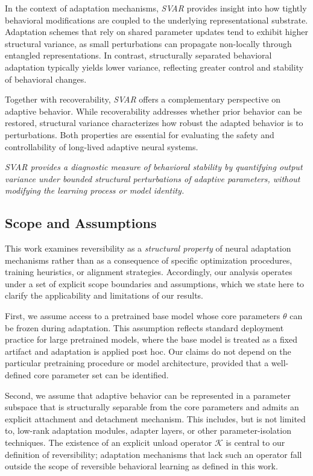 \documentclass[10pt]{article}
\begin{document}
	In the context of adaptation mechanisms, \emph{SVAR} provides insight into how tightly behavioral modifications are coupled to the underlying representational substrate. Adaptation schemes that rely on shared parameter updates tend to exhibit higher structural variance, as small perturbations can propagate non-locally through entangled representations. In contrast, structurally separated behavioral adaptation typically yields lower variance, reflecting greater control and stability of behavioral changes.
	
	Together with recoverability, \emph{SVAR} offers a complementary perspective on adaptive behavior. While recoverability addresses whether prior behavior can be restored, structural variance characterizes how robust the adapted behavior is to perturbations. Both properties are essential for evaluating the safety and controllability of long-lived adaptive neural systems.
	
	\emph{SVAR provides a diagnostic measure of behavioral stability by quantifying output variance under bounded structural perturbations of adaptive parameters, without modifying the learning process or model identity.}
	
	\subsection{Scope and Assumptions}
	\label{sec:scope}
	
	This work examines reversibility as a \emph{structural property} of neural adaptation mechanisms rather than as a consequence of specific optimization procedures, training heuristics, or alignment strategies. Accordingly, our analysis operates under a set of explicit scope boundaries and assumptions, which we state here to clarify the applicability and limitations of our results.
	
	First, we assume access to a pretrained base model whose core parameters $\theta$ can be frozen during adaptation. This assumption reflects standard deployment practice for large pretrained models, where the base model is treated as a fixed artifact and adaptation is applied post hoc. Our claims do not depend on the particular pretraining procedure or model architecture, provided that a well-defined core parameter set can be identified.
	
	Second, we assume that adaptive behavior can be represented in a parameter subspace that is structurally separable from the core parameters and admits an explicit attachment and detachment mechanism. This includes, but is not limited to, low-rank adaptation modules, adapter layers, or other parameter-isolation techniques. The existence of an explicit unload operator $\mathcal{K}$ is central to our definition of reversibility; adaptation mechanisms that lack such an operator fall outside the scope of reversible behavioral learning as defined in this work.
	
\end{document}
